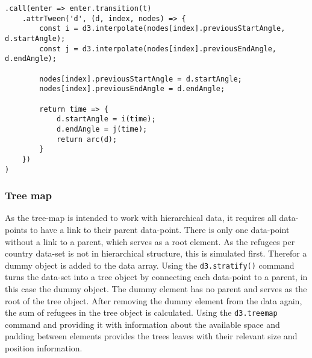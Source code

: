\begin{minipage}{\linewidth}
    \begin{lstlisting}[style=htmlcssjs, captionpos=b, caption={The implementation of the arc update animations. There are two interpolate functions defined in the beginning. They are called \texttt{i} and \texttt{j}. Next the new values for start and end angle are stored on the node itself. This needs to be done to be able to reference these values again for the next update, as the previous angles will not be accessible through the pie object after regenerating it for an update. Finally the function which is called for each frame of the animation is defined and returned. This function first interpolates the start and end angle values using the previously defined functions and the time of time which has already pased in the animation. This time value is in the range of zero to one, depending on how far along the animation is. These newly interpolated angles define the start and end angle of the pie piece, which is then turned into a path element by calling the \texttt{arc} function for this pie piece.}, label={lst:donut-chart}]
.call(enter => enter.transition(t)
    .attrTween('d', (d, index, nodes) => {
        const i = d3.interpolate(nodes[index].previousStartAngle, d.startAngle);
        const j = d3.interpolate(nodes[index].previousEndAngle, d.endAngle);

        nodes[index].previousStartAngle = d.startAngle;
        nodes[index].previousEndAngle = d.endAngle;

        return time => {
            d.startAngle = i(time);
            d.endAngle = j(time);
            return arc(d);
        }
    })
)
    \end{lstlisting}
\end{minipage}


\subsubsection{Tree map}
As the tree-map is intended to work with hierarchical data, it requires all data-points to have a link to their parent data-point. There is only one data-point without a link to a parent, which serves as a root element. As the refugees per country data-set is not in hierarchical structure, this is simulated first. Therefor a dummy object is added to the data array. Using the \texttt{d3.stratify()} command turns the data-set into a tree object by connecting each data-point to a parent, in this case the dummy object. The dummy element has no parent and serves as the root of the tree object. After removing the dummy element from the data again, the sum of refugees in the tree object is calculated. Using the \texttt{d3.treemap} command and providing it with information about the available space and padding between elements provides the trees leaves with their relevant size and position information.

